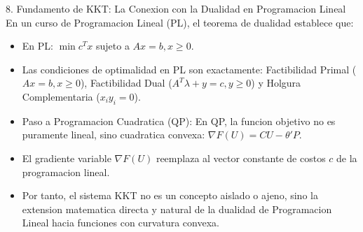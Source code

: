 \documentclass[aspectratio=169,10pt]{beamer}
\begin{document}
\begin{frame}{8. Fundamento de KKT: La Conexion con la Dualidad en Programacion Lineal}
  En un curso de Programacion Lineal (PL), el teorema de dualidad establece que:
  \vspace{0.3cm}
  \begin{itemize}
    \item En PL: $\min c^T x$ sujeto a $A x = b, x \ge 0$.
    \vspace{0.1cm}
    \item Las condiciones de optimalidad en PL son exactamente: Factibilidad Primal ($Ax = b, x \ge 0$), Factibilidad Dual ($A^T \lambda + y = c, y \ge 0$) y Holgura Complementaria ($x_i y_i = 0$).
    \vspace{0.3cm}
    \item Paso a Programacion Cuadratica (QP):
    En QP, la funcion objetivo no es puramente lineal, sino cuadratica convexa: $\nabla F(U) = CU - \theta' P$.
    \vspace{0.2cm}
    \item El gradiente variable $\nabla F(U)$ reemplaza al vector constante de costos $c$ de la programacion lineal.
    \vspace{0.2cm}
    \item Por tanto, el sistema KKT no es un concepto aislado o ajeno, sino la extension matematica directa y natural de la dualidad de Programacion Lineal hacia funciones con curvatura convexa.
  \end{itemize}
\end{frame}
\end{document}
